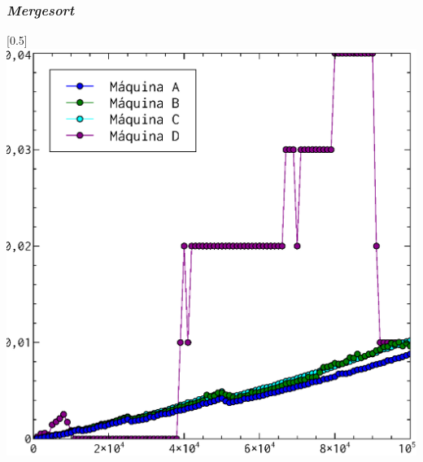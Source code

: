 \documentclass[compress]{beamer}
\begin{document}
\begin{frame}
\frametitle{\textit{Mergesort}}
	\begin{center}
\scalebox{0.53}[0.5]{
    \includegraphics[]{mergesort_todos.eps}
}
\end{center}
\end{frame}
\end{document}
